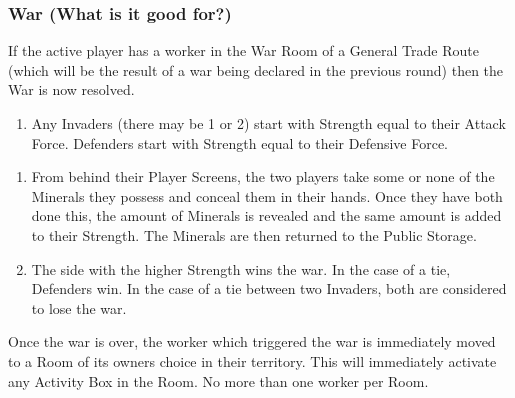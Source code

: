 \documentclass[10pt,twocolumn]{article}
\begin{document}
\subsubsection{War (What is it good for?)}
If the active player has a worker in the War Room of a General Trade Route (which will be the result of a war being declared in the previous round) then the War is now resolved.
\begin{enumerate}
\item Any Invaders (there may be 1 or 2) start with Strength equal to their Attack Force. Defenders start with Strength equal to their Defensive Force.
\end{enumerate}
\begin{enumerate}[resume]
\item From behind their Player Screens, the two players take some or none of the Minerals they possess and conceal them in their hands. Once they have both done this, the amount of Minerals is revealed and the same amount is added to their Strength. The Minerals are then returned to the Public Storage.
\item The side with the higher Strength wins the war. In the case of a tie, Defenders win. In the case of a tie between two Invaders, both are considered to lose the war.
\iftoggle{original-rules}{
\item The winning player (if any) receives \victorypoints: \eraCost{5}{10}{15} \vps\ for a winning Invader; \eraCost{3}{6}{9} \vps\ for a winning Defender. These \victorypoints\ are taken from the Public Storage.
\item In addition, if the difference in Strengths was 5 or more, the winner receives 7 \vps\ from the loser for a ``perfect victory''. This bonus can apply to Invaders or Defenders. It is important to note that these \vps\ are taken from the losing player, not the Public Storage.
}{
\item The winning player (if any) receives \victorypoints: \eraCost{5}{10}{15} \vps\ for a winning Invader; \eraCost{3}{6}{9} \vps\ for a winning Defender. This \victorypoint\ is taken from the Public Storage.
\item In addition, if the difference in Strengths was 5 or more, the winner receives 7 \vps\ from the loser for a ``perfect victory''. This bonus can apply to Invaders or Defenders. It is important to note that this \vps\ is taken from the losing player, not the Public Storage.
}
\end{enumerate}
Once the war is over, the worker which triggered the war is immediately moved to a Room of its owners choice in their territory. This will immediately activate any Activity Box in the Room. No more than one worker per Room.
\end{document}
